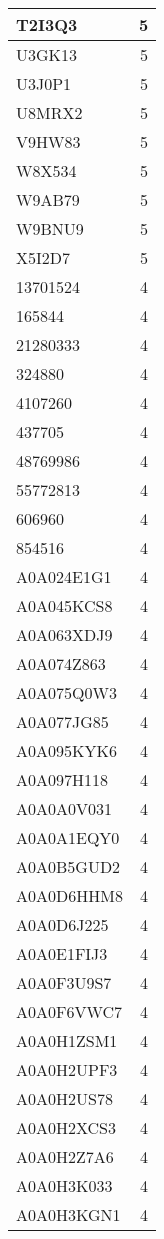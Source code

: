 \documentclass[
]{book}
\theoremstyle{definition}
\theoremstyle{definition}
\theoremstyle{definition}
\theoremstyle{definition}
\theoremstyle{remark}
\begin{document}
\begin{table}
\begin{tabular}{l|r}
\hline
T2I3Q3 & 5\\
\hline
U3GK13 & 5\\
\hline
U3J0P1 & 5\\
\hline
U8MRX2 & 5\\
\hline
V9HW83 & 5\\
\hline
W8X534 & 5\\
\hline
W9AB79 & 5\\
\hline
W9BNU9 & 5\\
\hline
X5I2D7 & 5\\
\hline
13701524 & 4\\
\hline
165844 & 4\\
\hline
21280333 & 4\\
\hline
324880 & 4\\
\hline
4107260 & 4\\
\hline
437705 & 4\\
\hline
48769986 & 4\\
\hline
55772813 & 4\\
\hline
606960 & 4\\
\hline
854516 & 4\\
\hline
A0A024E1G1 & 4\\
\hline
A0A045KCS8 & 4\\
\hline
A0A063XDJ9 & 4\\
\hline
A0A074Z863 & 4\\
\hline
A0A075Q0W3 & 4\\
\hline
A0A077JG85 & 4\\
\hline
A0A095KYK6 & 4\\
\hline
A0A097H118 & 4\\
\hline
A0A0A0V031 & 4\\
\hline
A0A0A1EQY0 & 4\\
\hline
A0A0B5GUD2 & 4\\
\hline
A0A0D6HHM8 & 4\\
\hline
A0A0D6J225 & 4\\
\hline
A0A0E1FIJ3 & 4\\
\hline
A0A0F3U9S7 & 4\\
\hline
A0A0F6VWC7 & 4\\
\hline
A0A0H1ZSM1 & 4\\
\hline
A0A0H2UPF3 & 4\\
\hline
A0A0H2US78 & 4\\
\hline
A0A0H2XCS3 & 4\\
\hline
A0A0H2Z7A6 & 4\\
\hline
A0A0H3K033 & 4\\
\hline
A0A0H3KGN1 & 4\\

\end{tabular}
\end{table}
\end{document}
